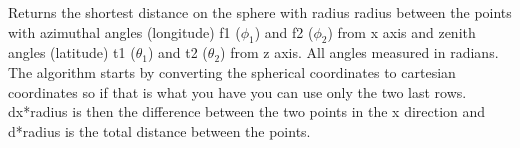 Returns the shortest distance on the sphere with radius radius between the points with azimuthal angles (longitude) f1 ($\phi_1$) and f2 ($\phi_2$) from x axis and zenith angles (latitude) t1 ($\theta_1$) and t2 ($\theta_2$) from z axis. All angles measured in radians. The algorithm starts by converting the spherical coordinates to cartesian coordinates so if that is what you have you can use only the two last rows. dx*radius is then the difference between the two points in the x direction and d*radius is the total distance between the points.